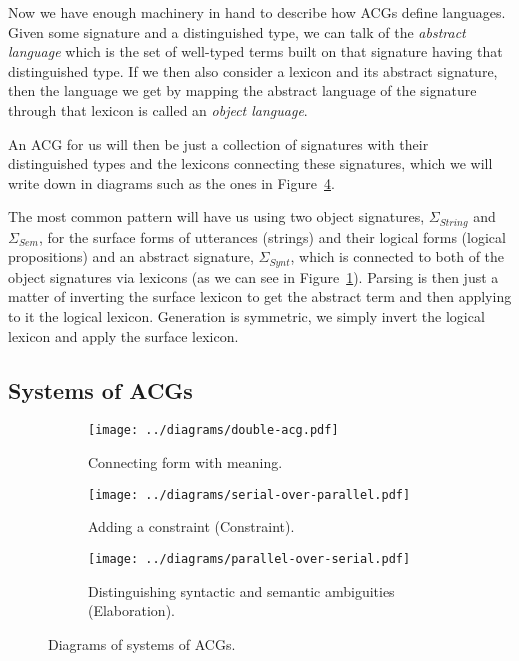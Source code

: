 \documentclass{llncs}
\begin{document}
Now we have enough machinery in hand to describe how ACGs define
languages. Given some signature and a distinguished type, we can talk of the
\emph{abstract language} which is the set of well-typed terms built on that
signature having that distinguished type. If we then also consider a lexicon
and its abstract signature, then the language we get by mapping the abstract
language of the signature through that lexicon is called an \emph{object
  language}.

An ACG for us will then be just a collection of signatures with their
distinguished types and the lexicons connecting these signatures, which we
will write down in diagrams such as the ones in Figure~\ref{fig:acg-comp}.

The most common pattern will have us using two object signatures,
$\Sigma_{String}$ and $\Sigma_{Sem}$, for the surface forms of utterances
(strings) and their logical forms (logical propositions) and an abstract
signature, $\Sigma_{Synt}$, which is connected to both of the object
signatures via lexicons (as we can see in
Figure~\ref{fig:acg-comp-basic}). Parsing is then just a matter of inverting
the surface lexicon to get the abstract term and then applying to it the
logical lexicon. Generation is symmetric, we simply invert the logical lexicon
and apply the surface lexicon.

\subsection{Systems of ACGs}

\begin{figure}[t]
  \centering
  \begin{subfigure}[b]{0.25\textwidth}
    \centering
    \texttt{[image: ../diagrams/double-acg.pdf]}
    \caption{\label{fig:acg-comp-basic} Connecting form with meaning.}
  \end{subfigure}
  \qquad
  \begin{subfigure}[b]{0.25\textwidth}
    \centering
    \texttt{[image: ../diagrams/serial-over-parallel.pdf]}
    \caption{\label{fig:acg-comp-constr} Adding a constraint (Constraint).}
  \end{subfigure}
  \qquad
  \begin{subfigure}[b]{0.25\textwidth}
    \centering
    \texttt{[image: ../diagrams/parallel-over-serial.pdf]}
    \caption{\label{fig:acg-comp-sem} Distinguishing syntactic and
      semantic ambiguities (Elaboration).}
  \end{subfigure}
  \caption{\label{fig:acg-comp} Diagrams of systems of ACGs.}
\end{figure}
\end{document}
